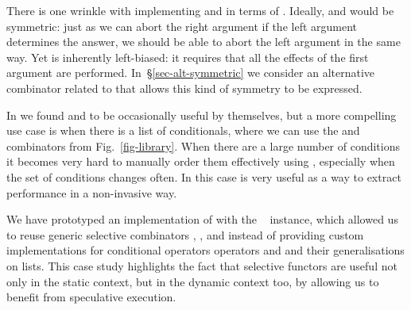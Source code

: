 There is one wrinkle with implementing  and 
in terms of . Ideally,  and  would be
symmetric: just as we can abort the right argument if the left
argument determines the answer, we should be able to abort the left
argument in the same way. Yet  is inherently left-biased:
it requires that all the effects of the first argument are performed.
In~\S\ref{sec-alt-symmetric} we consider an alternative combinator
related to  that allows this kind of symmetry to be expressed.

In \Haxl we found  and  to be occasionally useful by
themselves, but a more compelling use case is when there is a list of
conditionals, where we can use the  and  combinators
from Fig.~\ref{fig-library}. When there are a large number of conditions it
becomes very hard to manually order them effectively using ,
especially when the set of conditions changes often. In this case
 is very useful as a way to extract performance in a
non-invasive way.

We have prototyped an implementation of \Haxl with the ~
instance, which allowed us to reuse generic selective combinators
\hs{<||>}, \hs{<&&>},  and  instead of providing custom
implementations for conditional operators operators  and  and
their generalisations on lists. This case study highlights the fact that
selective functors are useful not only in the static context, but in the dynamic
context too, by allowing us to benefit from speculative execution.
